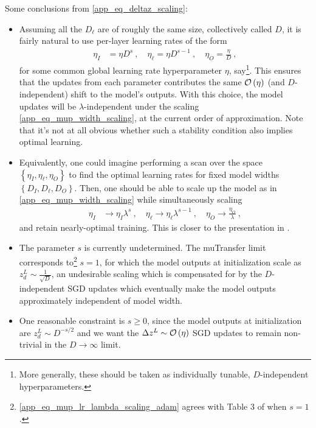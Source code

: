 \documentclass[11pt]{article}
\begin{document}
Some conclusions from \eqref{app_eq_deltaz_scaling}:
\begin{itemize}
    \item Assuming all the $ D_{ \ell } $ are of roughly the same size, collectively called $ D $,
        it is fairly natural to use per-layer learning rates of the form
        \begin{align}
            \eta_{ I } &= \eta  D^{ s }\ ,\quad
            \eta_{ \ell } = \eta D^{ s-1 }\ , \quad
            \eta_{ O } =\frac{ \eta }{ D } \ , \label{app_eq_mup_lr_scaling_sgd}
        \end{align}
        for some common global learning rate hyperparameter $ \eta $, say\footnote{More generally,
        these should be taken as individually tunable, $ D $-independent hyperparameters.}. This
        ensures that the updates from each parameter contributes the same $ \mathcal{O} \left( \eta
        \right)  $ (and $ D $-independent) shift to the model's outputs. With this choice, the model
        updates will be $ \lambda $-independent under the scaling \eqref{app_eq_mup_width_scaling},
        at the current order of approximation. Note that it's not at all obvious whether such a
        stability condition also implies optimal learning.
    \item Equivalently, one could imagine performing a scan over the space $ \left \{ \eta_{ I },
        \eta_{ \ell }, \eta_{ O } \right \} $ to find the optimal learning rates for fixed model
        widths $ \left \{ D_{ I }, D_{ \ell }, D_{ O } \right \} $. Then, one should be able to
        scale up the model as in \eqref{app_eq_mup_width_scaling} while simultaneously scaling
        \begin{align}
            \eta_{ I } &\longrightarrow \eta_{ I }  \lambda^{ s }\ ,\quad
            \eta_{ \ell } \longrightarrow \eta_{ \ell } \lambda^{ s-1 }\ , \quad
            \eta_{ O } \longrightarrow\frac{ \eta_{ O } }{ \lambda } \ , \label{app_eq_mup_lr_lambda_scaling_sgd}
        \end{align}
        and retain nearly-optimal training. This is closer to the presentation in
        \cite{yang2022tensor}.
    \item The parameter $ s $ is currently undetermined. The muTransfer limit \cite{yang2022tensor}
        corresponds to\footnote{\eqref{app_eq_mup_lr_lambda_scaling_adam} agrees with  Table 3 of
        \cite{yang2022tensor} when $ s=1 $.} $ s=1 $, for which the model outputs at initialization
        scale as $ z^{ L }_{ d }\sim \frac{ 1 }{ \sqrt{D} }  $, an undesirable scaling which is
        compensated for by the $ D $-independent SGD updates which eventually make the model outputs
        approximately independent of model width.
    \item One reasonable constraint is $ s \ge 0 $, since the model outputs at initialization are $
        z^{ L }_{ d }\sim D^{-s/2 }  $ and we want the $ \Delta z^{ L }\sim \mathcal{O} \left( \eta
        \right)  $ SGD updates to remain non-trivial in the $ D\longrightarrow \infty $ limit.
\end{itemize}
\end{document}

